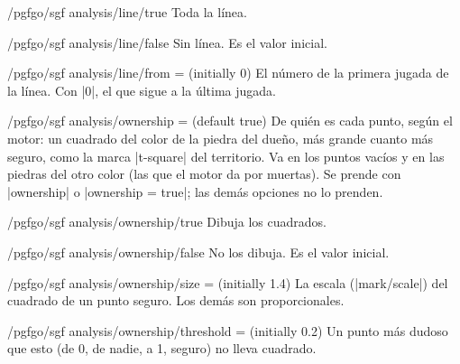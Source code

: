 \begin{stylekey}{/pgfgo/sgf analysis/line/true}
	Toda la línea.
\end{stylekey}

\begin{stylekey}{/pgfgo/sgf analysis/line/false}
	Sin línea. Es el valor inicial.
\end{stylekey}

\begin{key}{/pgfgo/sgf analysis/line/from =  (initially 0)}
	El número de la primera jugada de la línea. Con |0|, el que sigue a la última jugada.
\end{key}

\begin{key}{/pgfgo/sgf analysis/ownership =  (default true)}
	De quién es cada punto, según el motor: un cuadrado del color de la piedra del dueño, más grande cuanto más seguro, como la marca |t-square| del territorio. Va en los puntos vacíos y en las piedras del otro color (las que el motor da por muertas). Se prende con |ownership| o |ownership = true|; las demás opciones no lo prenden.

	\begin{codeexample}[]
		\begin{goban}[9, scale = 0.6]
		\end{goban}
	\end{codeexample}
\end{key}

\begin{stylekey}{/pgfgo/sgf analysis/ownership/true}
	Dibuja los cuadrados.
\end{stylekey}

\begin{stylekey}{/pgfgo/sgf analysis/ownership/false}
	No los dibuja. Es el valor inicial.
\end{stylekey}

\begin{key}{/pgfgo/sgf analysis/ownership/size =  (initially 1.4)}
	La escala (|mark/scale|) del cuadrado de un punto seguro. Los demás son proporcionales.
\end{key}

\begin{key}{/pgfgo/sgf analysis/ownership/threshold =  (initially 0.2)}
	Un punto más dudoso que esto (de 0, de nadie, a 1, seguro) no lleva cuadrado.
\end{key}

